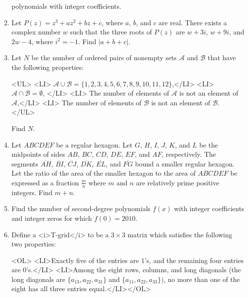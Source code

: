 \documentclass{article}
\begin{document}
\begin{enumerate}[label=\arabic*., itemsep=0.5em]
polynomials with integer coefficients.\par \vspace{0.5em}\item Let $P(z)=z^3+az^2+bz+c$, where $a$, $b$, and $c$ are real. There exists a complex number $w$ such that the three roots of $P(z)$ are $w+3i$, $w+9i$, and $2w-4$, where $i^2=-1$. Find $|a+b+c|$.\par \vspace{0.5em}\item Let $N$ be the number of ordered pairs of nonempty sets $\mathcal{A}$ and $\mathcal{B}$ that have the following properties:

<UL>
<LI> $\mathcal{A} \cup \mathcal{B} = \{1,2,3,4,5,6,7,8,9,10,11,12\}$,</LI>
<LI> $\mathcal{A} \cap \mathcal{B} = \emptyset$, </LI>
<LI> The number of elements of $\mathcal{A}$ is not an element of $\mathcal{A}$,</LI>
<LI> The number of elements of $\mathcal{B}$ is not an element of $\mathcal{B}$.
</UL>

Find $N$.\par \vspace{0.5em}\item Let $ABCDEF$ be a regular hexagon. Let $G$, $H$, $I$, $J$, $K$, and $L$ be the midpoints of sides $AB$, $BC$, $CD$, $DE$, $EF$, and $AF$, respectively. The segments $\overline{AH}$, $\overline{BI}$, $\overline{CJ}$, $\overline{DK}$, $\overline{EL}$, and $\overline{FG}$ bound a smaller regular hexagon. Let the ratio of the area of the smaller hexagon to the area of $ABCDEF$ be expressed as a fraction $\frac {m}{n}$ where $m$ and $n$ are relatively prime positive integers. Find $m + n$.\par \vspace{0.5em}\item Find the number of second-degree polynomials $f(x)$ with integer coefficients and integer zeros for which $f(0)=2010$.\par \vspace{0.5em}\item Define a <i>T-grid</i> to be a $3\times3$ matrix which satisfies the following two properties:

<OL>
<LI>Exactly five of the entries are $1$'s, and the remaining four entries are $0$'s.</LI>
<LI>Among the eight rows, columns, and long diagonals (the long diagonals are $\{a_{13},a_{22},a_{31}\}$ and $\{a_{11},a_{22},a_{33}\})$, no more than one of the eight has all three entries equal.</LI></OL>


\end{enumerate}
\end{document}
